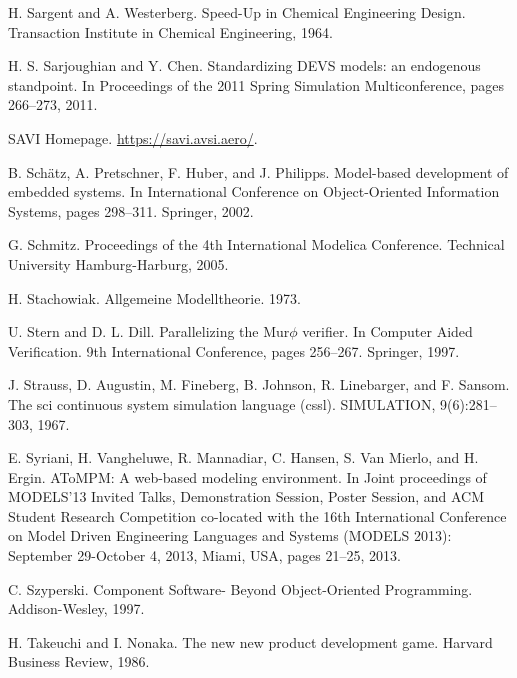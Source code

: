 \begin{description}[style=nextline,leftmargin=12mm,labelwidth=10mm,font=\normalfont]
\item[{[251]}] H. Sargent and A. Westerberg. Speed-Up in Chemical Engineering Design. Transaction Institute in Chemical Engineering, 1964.

\item[{[252]}] H. S. Sarjoughian and Y. Chen. Standardizing DEVS models: an endogenous standpoint. In Proceedings of the 2011 Spring Simulation Multiconference, pages 266–273, 2011.

\item[{[253]}] SAVI Homepage. \url{https://savi.avsi.aero/}.

\item[{[254]}] B. Schätz, A. Pretschner, F. Huber, and J. Philipps. Model-based development of embedded systems. In International Conference on Object-Oriented Information Systems, pages 298–311. Springer, 2002.

\item[{[255]}] G. Schmitz. Proceedings of the 4th International Modelica Conference. Technical University Hamburg-Harburg, 2005.

\item[{[256]}] H. Stachowiak. Allgemeine Modelltheorie. 1973.

\item[{[257]}] U. Stern and D. L. Dill. Parallelizing the Mur$\phi$ verifier. In Computer Aided Verification. 9th International Conference, pages 256–267. Springer, 1997.

\item[{[258]}] J. Strauss, D. Augustin, M. Fineberg, B. Johnson, R. Linebarger, and F. Sansom. The sci continuous system simulation language (cssl). SIMULATION, 9(6):281–303, 1967.

\item[{[259]}] E. Syriani, H. Vangheluwe, R. Mannadiar, C. Hansen, S. Van Mierlo, and H. Ergin. AToMPM: A web-based modeling environment. In Joint proceedings of MODELS’13 Invited Talks, Demonstration Session, Poster Session, and ACM Student Research Competition co-located with the 16th International Conference on Model Driven Engineering Languages and Systems (MODELS 2013): September 29-October 4, 2013, Miami, USA, pages 21–25, 2013.

\item[{[260]}] C. Szyperski. Component Software- Beyond Object-Oriented Programming. Addison-Wesley, 1997.

\item[{[261]}] H. Takeuchi and I. Nonaka. The new new product development game. Harvard Business Review, 1986.


\end{description}
